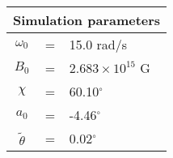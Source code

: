  \begin{tabular}{ccl}
\multicolumn{3}{c}{Simulation parameters} \\
\hline
$\omega_0$  &=& 15.0 rad/s\\
$B_0$  &=& $ 2.683\times 10^{15} $ G \\
$\chi$  &=& 60.10$^{\circ}$ \\
$a_0$ &=& -4.46$^{\circ}$ \\
$\tilde{\theta}$ &= & 0.02$^{\circ}$
\end{tabular}
    